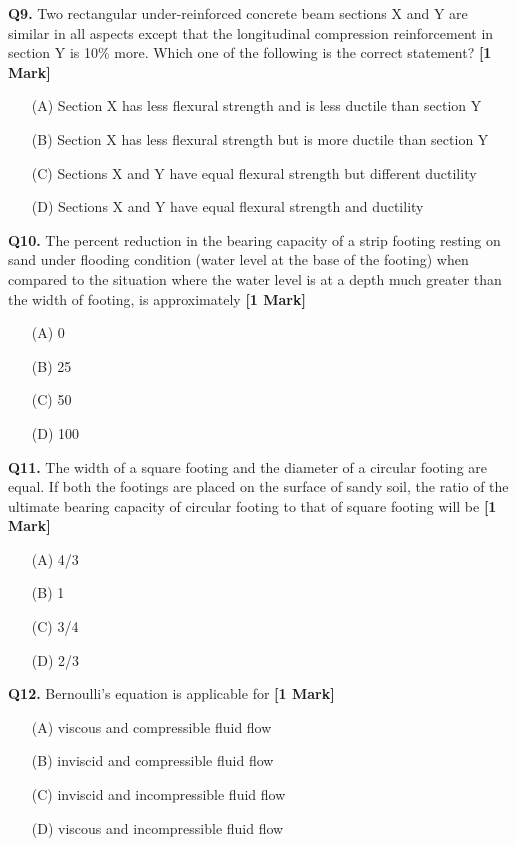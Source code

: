 \documentclass[11pt]{article}
\newcommand{\questiona}[2]{
    \noindent\textbf{Q#2.} #1 \hfill \textbf{[1 Mark]}
}
\begin{document}
\questiona{Two rectangular under-reinforced concrete beam sections X and Y are similar in all aspects except that the longitudinal compression reinforcement in section Y is 10\% more. Which one of the following is the correct statement?}{9}
\begin{enumerate}
    \item[(A)] Section X has less flexural strength and is less ductile than section Y
    \item[(B)] Section X has less flexural strength but is more ductile than section Y
    \item[(C)] Sections X and Y have equal flexural strength but different ductility
    \item[(D)] Sections X and Y have equal flexural strength and ductility
\end{enumerate}
\vspace{0.5cm}

\questiona{The percent reduction in the bearing capacity of a strip footing resting on sand under flooding condition (water level at the base of the footing) when compared to the situation where the water level is at a depth much greater than the width of footing, is approximately}{10}
\begin{enumerate}
    \item[(A)] 0
    \item[(B)] 25
    \item[(C)] 50
    \item[(D)] 100
\end{enumerate}
\vspace{0.5cm}

\questiona{The width of a square footing and the diameter of a circular footing are equal. If both the footings are placed on the surface of sandy soil, the ratio of the ultimate bearing capacity of circular footing to that of square footing will be}{11}
\begin{enumerate}
    \item[(A)] 4/3
    \item[(B)] 1
    \item[(C)] 3/4
    \item[(D)] 2/3
\end{enumerate}
\vspace{0.5cm}

\questiona{Bernoulli's equation is applicable for}{12}
\begin{enumerate}
    \item[(A)] viscous and compressible fluid flow
    \item[(B)] inviscid and compressible fluid flow
    \item[(C)] inviscid and incompressible fluid flow
    \item[(D)] viscous and incompressible fluid flow
\end{enumerate}
\vspace{0.5cm}
\end{document}
